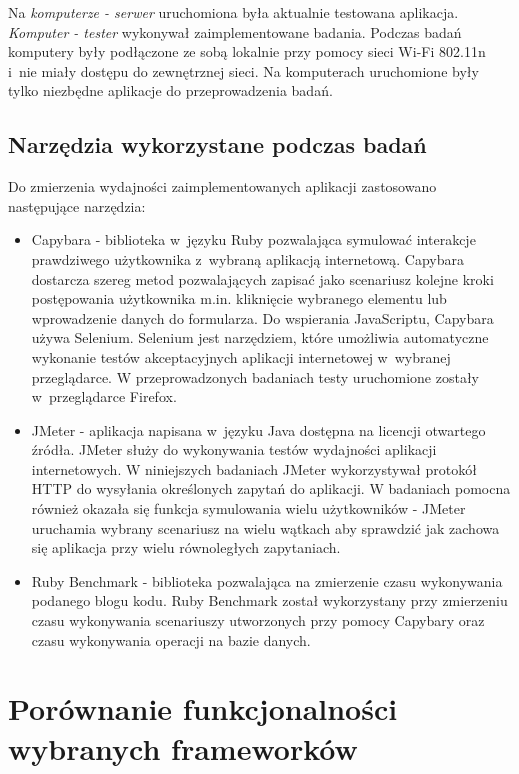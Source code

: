 \documentclass[printmode]{mgr}
\begin{document}
Na \textit{komputerze - serwer} uruchomiona była aktualnie testowana aplikacja. \textit{Komputer - tester} wykonywał zaimplementowane badania. Podczas badań komputery były podłączone ze sobą lokalnie przy pomocy sieci Wi-Fi 802.11n i~nie miały dostępu do zewnętrznej sieci. Na komputerach uruchomione były tylko niezbędne aplikacje do przeprowadzenia badań.

\subsection{Narzędzia wykorzystane podczas badań}
Do zmierzenia wydajności zaimplementowanych aplikacji zastosowano następujące narzędzia:
\begin{itemize}
  \item{Capybara} - biblioteka w~języku Ruby pozwalająca symulować interakcje prawdziwego użytkownika z~wybraną aplikacją internetową. Capybara dostarcza szereg metod pozwalających zapisać jako scenariusz kolejne kroki postępowania użytkownika m.in. kliknięcie wybranego elementu lub wprowadzenie danych do formularza. Do wspierania JavaScriptu, Capybara używa Selenium. Selenium jest narzędziem, które umożliwia automatyczne wykonanie testów akceptacyjnych aplikacji internetowej w~wybranej przeglądarce. W przeprowadzonych badaniach testy uruchomione zostały w~przeglądarce Firefox. \cite{doc_capybara}
  \item{JMeter} - aplikacja napisana w~języku Java dostępna na licencji otwartego źródła. JMeter służy do wykonywania testów wydajności aplikacji internetowych. W niniejszych badaniach JMeter wykorzystywał protokół HTTP do wysyłania określonych zapytań do aplikacji. W badaniach pomocna również okazała się funkcja symulowania wielu użytkowników - JMeter uruchamia wybrany scenariusz na wielu wątkach aby sprawdzić jak zachowa się aplikacja przy wielu równoległych zapytaniach. \cite{doc_jmeter}
  \item{Ruby Benchmark} - biblioteka pozwalająca na zmierzenie czasu wykonywania podanego blogu kodu. Ruby Benchmark został wykorzystany przy zmierzeniu czasu wykonywania scenariuszy utworzonych przy pomocy Capybary oraz czasu wykonywania operacji na bazie danych. \cite{doc_benchmark}
\end{itemize}

\section{Porównanie funkcjonalności wybranych frameworków}
\end{document}
